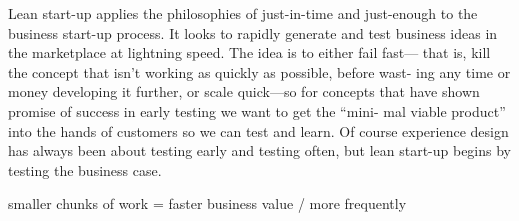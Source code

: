 {Lean start-up applies the philosophies of just-in-time and just-enough to the business start-up process. It looks to rapidly generate and test business ideas in the marketplace at lightning speed. The idea is to either fail fast— that is, kill the concept that isn’t working as quickly as possible, before wast- ing any time or money developing it further, or scale quick—so for concepts that have shown promise of success in early testing we want to get the “mini- mal viable product” into the hands of customers so we can test and learn.
Of course experience design has always been about testing early and testing often, but lean start-up begins by testing the business case.

smaller chunks of work = faster business value / more frequently
}